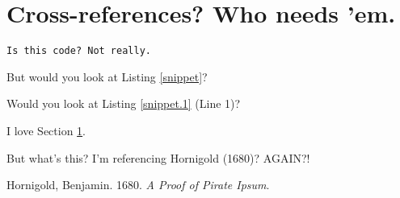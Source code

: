 \section{Cross-references? Who needs 'em.}\label{me}

\label{snippet}%
\begin{verbatim}
Is this code? Not really.
\end{verbatim}

But would you look at Listing \ref{snippet}?

Would you look at Listing \ref{snippet.1} (Line 1)?

I love Section \ref{me}.

But what's this? I'm referencing Hornigold (1680)? AGAIN?!

\label{refs}
\begin{CSLReferences}{1}{0}
Hornigold, Benjamin. 1680. \emph{A Proof of Pirate Ipsum}.

\end{CSLReferences}
